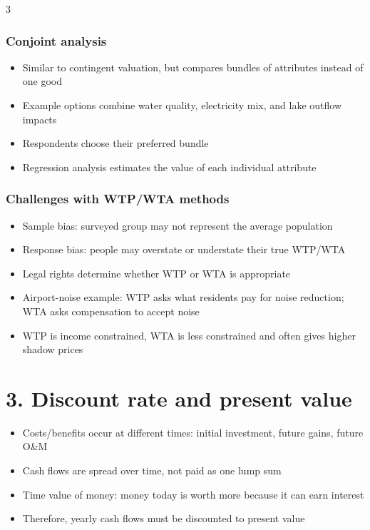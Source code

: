 \documentclass[9pt, landscape, a4paper]{article}
\begin{document}
\begin{multicols*}{3}
\subsubsection{Conjoint analysis}
\begin{itemize}
  \item Similar to contingent valuation, but compares bundles of attributes instead of one good
  \item Example options combine water quality, electricity mix, and lake outflow impacts
  \item Respondents choose their preferred bundle
  \item Regression analysis estimates the value of each individual attribute
\end{itemize}

\subsubsection{Challenges with WTP/WTA methods}
\begin{itemize}
  \item Sample bias: surveyed group may not represent the average population
  \item Response bias: people may overstate or understate their true WTP/WTA
  \item Legal rights determine whether WTP or WTA is appropriate
  \item Airport-noise example: WTP asks what residents pay for noise reduction; WTA asks compensation to accept noise
  \item WTP is income constrained, WTA is less constrained and often gives higher shadow prices
\end{itemize}

\section{3. Discount rate and present value}
\begin{itemize}
  \item Costs/benefits occur at different times: initial investment, future gains, future O\&M
  \item Cash flows are spread over time, not paid as one lump sum
  \item Time value of money: money today is worth more because it can earn interest
  \item Therefore, yearly cash flows must be discounted to present value
\end{itemize}


\end{multicols*}
\end{document}

